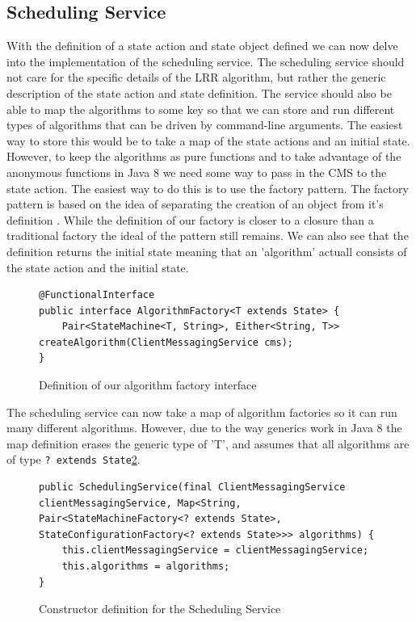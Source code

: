 \documentclass[a4paper]{article} %
\begin{document}
\subsection*{Scheduling Service}
With the definition of a state action and state object defined we can now delve into the implementation of the scheduling service.
The scheduling service should not care for the specific details of the LRR algorithm, but rather the generic description of the state action and state definition. 
The service should also be able to map the algorithms to some key so that we can store and run different types of algorithms that can be driven by command-line arguments.
The easiest way to store this would be to take a map of the state actions and an initial state.
However, to keep the algorithms as pure functions and to take advantage of the anonymous functions in Java 8 we need some way to pass in the CMS to the state action. 
The easiest way to do this is to use the factory pattern. The factory pattern is based on the idea of separating the creation of an object from it's definition \cite{gamma_2016}.
While the definition of our factory is closer to a closure than a traditional factory the ideal of the pattern still remains.
We can also see that the definition returns the initial state meaning that an 'algorithm' actuall consists of the state action and the initial state.
\newline
\begin{figure}[ht!]
\label{algorithm_factory}
\begin{lstlisting}
@FunctionalInterface
public interface AlgorithmFactory<T extends State> {
    Pair<StateMachine<T, String>, Either<String, T>> createAlgorithm(ClientMessagingService cms);
}
\end{lstlisting}
\caption{Definition of our algorithm factory interface}
\end{figure}
The scheduling service can now take a map of algorithm factories so it can run many different algorithms.
However, due to the way generics work in Java 8 the map definition erases the generic type of 'T', and assumes that all algorithms are of type \lstinline{? extends State}\ref{ss_ctor}.
\begin{figure}[ht!]
\begin{lstlisting}
public SchedulingService(final ClientMessagingService clientMessagingService, Map<String, Pair<StateMachineFactory<? extends State>, StateConfigurationFactory<? extends State>>> algorithms) {
    this.clientMessagingService = clientMessagingService;
    this.algorithms = algorithms;
}
\end{lstlisting}
\label{ss_ctor}
\caption{Constructor definition for the Scheduling Service}
\end{figure}
\end{document}
